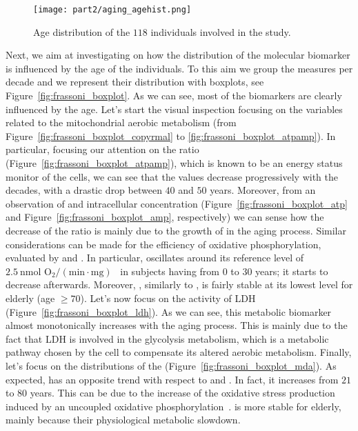 \begin{figure}[]
	\centering
	\texttt{[image: part2/aging\_agehist.png]}
	\caption{Age distribution of the $118$ individuals involved in the study.} \label{fig:frassoni_agehist}
\end{figure}

Next, we aim at investigating on how the distribution of the molecular biomarker is influenced by the age of the individuals. To this aim we group the measures per decade and we represent their distribution with boxplots, see Figure~\ref{fig:frassoni_boxplot}.
As we can see, most of the biomarkers are clearly influenced by the age.
Let's start the visual inspection focusing on the variables related to the mitochondrial aerobic metabolism (from Figure~\ref{fig:frassoni_boxplot_copyrmal} to \ref{fig:frassoni_boxplot_atpamp}).
In particular, focusing our attention on the \atpamp ratio (Figure~\ref{fig:frassoni_boxplot_atpamp}), which is known to be an energy status monitor of the cells, we can see that the values decrease progressively with the decades, with a drastic drop between $40$ and $50$ years. Moreover, from an observation of \atp and \amp intracellular concentration (Figure~\ref{fig:frassoni_boxplot_atp} and Figure~\ref{fig:frassoni_boxplot_amp}, respectively) we can sense how the decrease of the \atpamp ratio is mainly due to the growth of \amp in the aging process.
Similar considerations can be made for the efficiency of oxidative phosphorylation, evaluated by \popyrmal and \posucc. In particular, \popyrmal oscillates around its reference level of $2.5~\text{nmol~O}_2/(\text{min}\cdot\text{mg})$~\cite{hinkle2005p} in subjects having from $0$ to $30$ years; it starts to decrease afterwards. Moreover, \popyrmal, similarly to \atpamp, is fairly stable at its lowest level for elderly (age $\geq 70$).
Let's now focus on the activity of LDH (Figure~\ref{fig:frassoni_boxplot_ldh}). As we can see, this metabolic biomarker almost monotonically increases with the aging process.
This is mainly due to the fact that LDH is involved in the glycolysis metabolism, which is a metabolic pathway chosen by the cell to compensate its altered aerobic metabolism.
Finally, let's focus on the distributions of the \mda (Figure~\ref{fig:frassoni_boxplot_mda}). As expected, \mda has an opposite trend with respect to \atpamp and \popyrmal. In fact, it increases from $21$ to $80$ years. This can be due to the increase of the oxidative stress production induced by an uncoupled oxidative phosphorylation~\cite{dai2014mitochondrial}.
\mda is more stable for elderly, mainly because their physiological metabolic slowdown.

